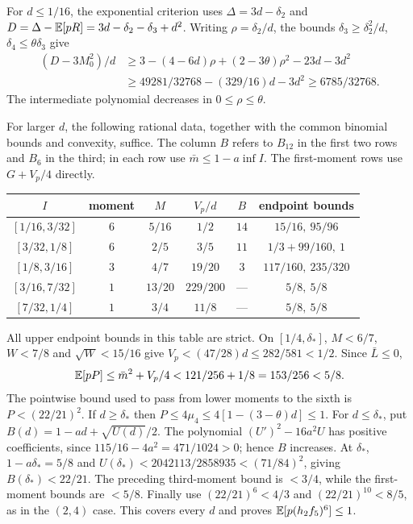 For $d\le1/16$, the exponential criterion uses
$\Delta=3d-\delta_{2}$ and $D=\Delta-\mathbb E[pR]=3d-\delta_{2}-\delta_{3}+d^2$.
Writing $\rho=\delta_{2}/d$, the bounds $\delta_{3}\ge \delta_{2}^2/d$, $\delta_{4}\le\theta \delta_{3}$
give
\[
 \begin{aligned}
 (D-3M_0^2)/d&\ge
 3-(4-6d)\rho+(2-3\theta)\rho^2-23d-3d^2\\
 &\ge49281/32768-(329/16)d-3d^2\ge6785/32768.
 \end{aligned}
\]
The intermediate polynomial decreases in $0\le\rho\le\theta$.

For larger $d$, the following rational data, together with the common
binomial bounds and convexity, suffice. The column $B$ refers to $B_{12}$
in the first two rows and $B_6$ in the third; in each row use
$\bar m\le1-a\inf I$. The first-moment rows use $G+V_p/4$ directly.
\begin{center}
\begin{tabular}{@{}cccccc@{}}
\toprule
$I$ & moment & $M$ & $V_p/d$ & $B$ & endpoint bounds\\\midrule
$[1/16,3/32]$ & $6$ & $5/16$ & $1/2$ & $14$ & $15/16,\ 95/96$\\
$[3/32,1/8]$ & $6$ & $2/5$ & $3/5$ & $11$ & $1/3+99/160,\ 1$\\
$[1/8,3/16]$ & $3$ & $4/7$ & $19/20$ & $3$ & $117/160,\ 235/320$\\
$[3/16,7/32]$ & $1$ & $13/20$ & $229/200$ & --- & $5/8,\ 5/8$\\
$[7/32,1/4]$ & $1$ & $3/4$ & $11/8$ & --- & $5/8,\ 5/8$\\
\bottomrule
\end{tabular}
\end{center}
All upper endpoint bounds in this table are strict. On $[1/4,\delta_{*}]$,
$M<6/7$, $W<7/8$ and $\sqrt W<15/16$ give
$V_p<(47/28)d\le282/581<1/2$. Since $\bar L\le0$,
\[
 \mathbb E[pP]\le\bar m^2+V_p/4<121/256+1/8=153/256<5/8.
\]
The pointwise bound used to pass from lower moments
to the sixth is $P<(22/21)^2$. If $d\ge \delta_{*}$ then
$P\le4\mu_4\le4[1-(3-\theta)d]\le1$.
For $d\le \delta_{*}$, put $B(d)=1-ad+\sqrt{U(d)}/2$.
The polynomial $(U')^2-16a^2U$ has positive coefficients, since
$115/16-4a^2=471/1024>0$; hence $B$ increases.
At $\delta_{*}$, $1-a\delta_{*}=5/8$ and
$U(\delta_{*})<2042113/2858935<(71/84)^2$, giving $B(\delta_{*})<22/21$.
The preceding third-moment bound is $<3/4$, while the first-moment
bounds are $<5/8$. Finally use
$(22/21)^6<4/3$ and $(22/21)^{10}<8/5$, as in the $(2,4)$ case.
This covers every $d$ and proves $\mathbb E[p(h_2f_5)^6]\le1$.
